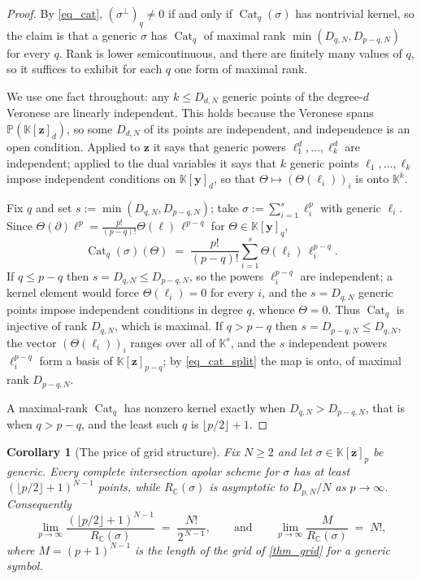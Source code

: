 \documentclass[final]{siamltex}
\DeclareMathOperator{\Cat}{Cat}
\newtheorem{corollary}[corollary]{Corollary}
\newcommand{\C}{\mathbb{C}}
\newcommand{\K}{\mathbb{K}}
\newcommand{\by}{\bm{y}}
\newcommand{\bz}{\bm{z}}
\begin{document}
\begin{proof}
  By \eqref{eq_cat}, $(\sigma^{\perp})_{q} \neq 0$ if and only if
  $\Cat_{q}(\sigma)$ has nontrivial kernel, so the claim is that a generic
  $\sigma$ has $\Cat_{q}$ of maximal rank $\min(D_{q,N},D_{p-q,N})$ for every
  $q$.  Rank is lower semicontinuous, and there are finitely many values of $q$,
  so it suffices to exhibit for each $q$ one form of maximal rank.

  We use one fact throughout: any $k \le D_{d,N}$ generic points of the
  degree-$d$ Veronese are linearly independent.  This holds because the Veronese
  spans $\mathbb{P}(\K[\bz]_{d})$, so some $D_{d,N}$ of its points are
  independent, and independence is an open condition.  Applied to $\bz$ it says
  that generic powers $\ell_{1}^{d},\ldots,\ell_{k}^{d}$ are independent;
  applied to the dual variables it says that $k$ generic points
  $\ell_{1},\ldots,\ell_{k}$ impose independent conditions on $\K[\by]_{d}$, so
  that $\Theta \mapsto (\Theta(\ell_{i}))_{i}$ is onto $\K^{k}$.

  Fix $q$ and set $s := \min(D_{q,N},D_{p-q,N})$; take
  $\sigma := \sum_{i=1}^{s}\ell_{i}^{p}$ with generic $\ell_{i}$.  Since
  $\Theta(\partial)\ell^{p} = \frac{p!}{(p-q)!}\Theta(\ell)\,\ell^{p-q}$ for
  $\Theta \in \K[\by]_{q}$,
  \begin{equation}\label{eq_cat_split}
    \Cat_{q}(\sigma)(\Theta) \;=\; \frac{p!}{(p-q)!}\sum_{i=1}^{s}\Theta(\ell_{i})\,\ell_{i}^{p-q}.
  \end{equation}
  If $q \le p-q$ then $s = D_{q,N} \le D_{p-q,N}$, so the powers
  $\ell_{i}^{p-q}$ are independent; a kernel element would force
  $\Theta(\ell_{i})=0$ for every $i$, and the $s = D_{q,N}$ generic points
  impose independent conditions in degree $q$, whence $\Theta = 0$.  Thus
  $\Cat_{q}$ is injective of rank $D_{q,N}$, which is maximal.  If $q > p-q$
  then $s = D_{p-q,N} \le D_{q,N}$, the vector $(\Theta(\ell_{i}))_{i}$ ranges
  over all of $\K^{s}$, and the $s$ independent powers $\ell_{i}^{p-q}$ form a
  basis of $\K[\bz]_{p-q}$; by \eqref{eq_cat_split} the map is onto, of maximal
  rank $D_{p-q,N}$.

  A maximal-rank $\Cat_{q}$ has nonzero kernel exactly when
  $D_{q,N} > D_{p-q,N}$, that is when $q > p-q$, and the least such $q$ is
  $\lfloor p/2\rfloor+1$.
\end{proof}

\begin{corollary}[The price of grid structure]\label{cor_price}
  Fix $N \ge 2$ and let $\sigma \in \K[\bz]_{p}$ be generic.  Every complete
  intersection apolar scheme for $\sigma$ has at least
  $(\lfloor p/2\rfloor+1)^{N-1}$ points, while $R_{\C}(\sigma)$ is asymptotic to
  $D_{p,N}/N$ as $p \to \infty$.  Consequently
  \begin{equation}\label{eq_price}
    \lim_{p\to\infty}
    \frac{(\lfloor p/2\rfloor+1)^{N-1}}{R_{\C}(\sigma)}
    \;=\; \frac{N!}{2^{\,N-1}},
    \qquad\text{and}\qquad
    \lim_{p\to\infty}\frac{M}{R_{\C}(\sigma)} \;=\; N!,
  \end{equation}
  where $M = (p+1)^{N-1}$ is the length of the grid of \cref{thm_grid} for a
  generic symbol.
\end{corollary}
\end{document}
